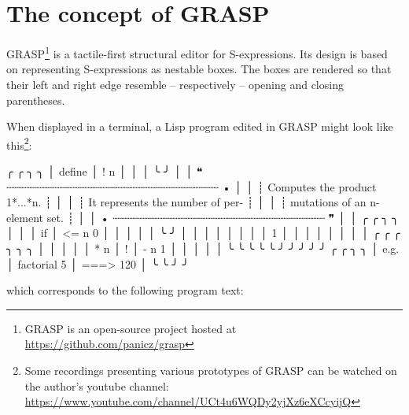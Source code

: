 \documentclass[sigconf]{acmart}
\newenvironment{Snippet}{\Verbatim[samepage=true]}{\endVerbatim}
\begin{document}


\maketitle

\section{The concept of GRASP}

GRASP\footnote{GRASP is an open-source project hosted at
  \url{https://github.com/panicz/grasp}} is a tactile-first
structural editor for S-expressions.
Its design is based on representing S-expressions as
nestable boxes. The boxes are rendered so that their left 
and right edge resemble -- respectively -- opening and closing 
parentheses.

When displayed in a terminal, a Lisp program edited in GRASP
might look like this\footnote{Some recordings presenting various
  prototypes of GRASP can be watched on the author's youtube channel:
  \url{https://www.youtube.com/channel/UCt4u6WQDy2yjXz6eXCcyijQ}}:

\begin{Snippet}
╭        ╭     ╮                       ╮
│ define │ ! n │                       │
│        ╰     ╯                       │
│ ❝ ┈┈┈┈┈┈┈┈┈┈┈┈┈┈┈┈┈┈┈┈┈┈┈┈┈┈┈┈┈┈┈┈ • │
│ ┊ Computes the product 1*...*n.    ┊ │
│ ┊ It represents the number of per- ┊ │
│ ┊ mutations of an n-element set.   ┊ │
│ • ┈┈┈┈┈┈┈┈┈┈┈┈┈┈┈┈┈┈┈┈┈┈┈┈┈┈┈┈┈┈┈┈ ❞ │
│   ╭    ╭        ╮                 ╮  │
│   │ if │ <= n 0 │                 │  │
│   │    ╰        ╯                 │  │
│   │                               │  │
│   │       1                       │  │
│   │                               │  │
│   │       ╭     ╭   ╭       ╮ ╮ ╮ │  │
│   │       │ * n │ ! │ - n 1 │ │ │ │  │
╰   ╰       ╰     ╰   ╰       ╯ ╯ ╯ ╯  ╯
╭      ╭             ╮          ╮       
│ e.g. │ factorial 5 │ ===> 120 │       
╰      ╰             ╯          ╯       
\end{Snippet}

which corresponds to the following program text:
\end{document}
